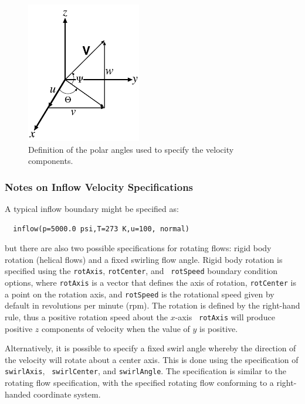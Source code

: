\documentclass{article}
\begin{document}
\begin{figure}[htbp]
\begin{center}
\includegraphics[width=5cm]{Figures/polar}
\caption{Definition of the polar angles used to specify the velocity components.}
\label{polar}
\end{center}
\end{figure}



\subsubsection{ Notes on Inflow Velocity Specifications}

A typical inflow boundary might be specified as:
\begin{verbatim}
  inflow(p=5000.0 psi,T=273 K,u=100, normal)
\end{verbatim}
but there are also two possible specifications for rotating flows: rigid body rotation
(helical flows) and a fixed swirling flow angle.  Rigid body rotation
is specified using the {\tt rotAxis}, {\tt rotCenter}, and {\tt
rotSpeed} boundary condition options, where {\tt rotAxis} is a vector
that defines the axis of rotation, {\tt rotCenter} is a point on the
rotation axis, and {\tt rotSpeed} is the rotational speed given by
default in revolutions per minute (rpm).  The rotation is defined by the
right-hand rule, thus a positive rotation speed about the $x$-axis {\tt
rotAxis} will produce positive $z$ components of velocity when the value
of $y$ is positive.

Alternatively, it is possible to specify a fixed swirl angle whereby
the direction of the velocity will rotate about a center axis.  This
is done using the specification of {\tt swirlAxis}, {\tt
swirlCenter}, and {\tt swirlAngle}.  The specification is similar to
the rotating flow specification, with the specified rotating flow
conforming to a right-handed coordinate system.
\end{document}
